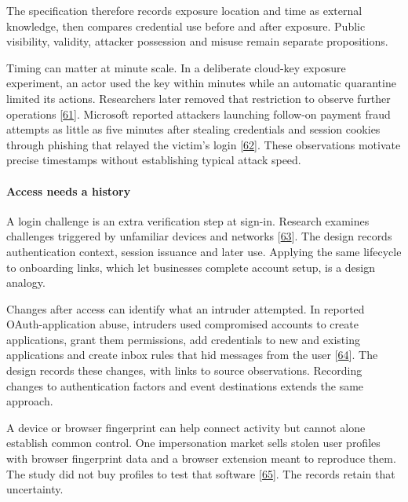 \documentclass[
  11pt,
]{article}
\begin{document}
The specification therefore records exposure location and time as
external knowledge, then compares credential use before and after
exposure. Public visibility, validity, attacker possession and misuse
remain separate propositions.

Timing can matter at minute scale. In a deliberate cloud-key exposure
experiment, an actor used the key within minutes while an automatic
quarantine limited its actions. Researchers later removed that
restriction to observe further operations
{[}\protect\hyperlink{ref-Gamazo2023}{61}{]}. Microsoft reported
attackers launching follow-on payment fraud attempts as little as five
minutes after stealing credentials and session cookies through phishing
that relayed the victim's login
{[}\protect\hyperlink{ref-Microsoft2022AiTM}{62}{]}. These observations
motivate precise timestamps without establishing typical attack speed.

\hypertarget{access-needs-a-history}{%
\paragraph{Access needs a history}\label{access-needs-a-history}}

A login challenge is an extra verification step at sign-in. Research
examines challenges triggered by unfamiliar devices and networks
{[}\protect\hyperlink{ref-Doerfler2019}{63}{]}. The design records
authentication context, session issuance and later use. Applying the
same lifecycle to onboarding links, which let businesses complete
account setup, is a design analogy.

Changes after access can identify what an intruder attempted. In
reported OAuth-application abuse, intruders used compromised accounts to
create applications, grant them permissions, add credentials to new and
existing applications and create inbox rules that hid messages from the
user {[}\protect\hyperlink{ref-Microsoft2023OAuth}{64}{]}. The design
records these changes, with links to source observations. Recording
changes to authentication factors and event destinations extends the
same approach.

A device or browser fingerprint can help connect activity but cannot
alone establish common control. One impersonation market sells stolen
user profiles with browser fingerprint data and a browser extension
meant to reproduce them. The study did not buy profiles to test that
software {[}\protect\hyperlink{ref-Campobasso2020}{65}{]}. The records
retain that uncertainty.
\end{document}
